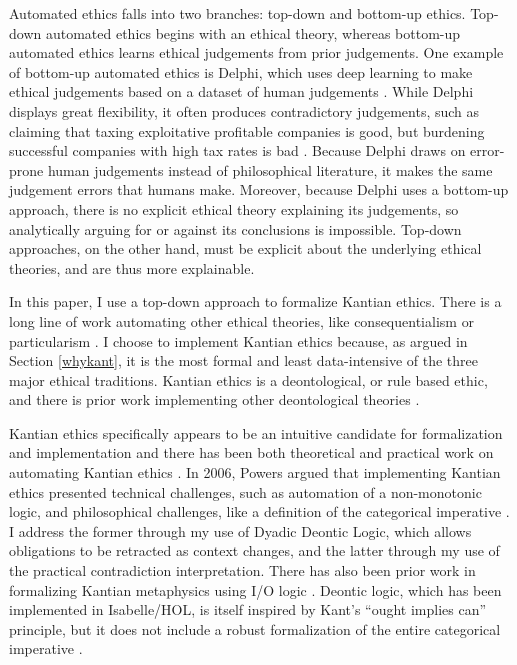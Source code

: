 \begin{isabellebody}
\begin{isamarkuptext}
Automated ethics falls into two branches: top-down and bottom-up ethics. Top-down automated ethics begins 
with an ethical theory, whereas bottom-up automated ethics learns ethical judgements from prior 
judgements. One example of bottom-up automated ethics is Delphi, which uses deep learning to make 
ethical judgements based on a dataset of human judgements \citep{delphi}. While Delphi displays great 
flexibility, it often produces contradictory judgements, such as claiming that taxing exploitative 
profitable companies is good, but burdening successful companies with high tax rates is bad \citep{verge}. 
Because Delphi draws on error-prone human judgements instead of philosophical literature, it makes 
the same judgement errors that humans make. Moreover, because Delphi uses a bottom-up approach, 
there is no explicit ethical theory explaining its judgements, so analytically arguing for or 
against its conclusions is impossible. Top-down approaches, on the other hand, must be explicit about 
the underlying ethical theories, and are thus more explainable. 

In this paper, I use a top-down approach to formalize Kantian ethics. There is a long line of work 
automating other ethical theories, like consequentialism \citep{util2, util1} or particularism 
\citep{particularism1, particularism2}. I choose to implement Kantian ethics because, as argued in 
Section \ref{whykant}, it is the most formal and least data-intensive of the three major ethical 
traditions. Kantian ethics is a deontological, or rule based ethic, and there is prior work 
implementing other deontological theories \citep{deon1, deon2, dde}. 

Kantian ethics specifically appears to be an intuitive candidate for formalization and implementation 
and there has been both theoretical and practical work on automating Kantian ethics \citep{powers, lin}. 
In 2006, Powers argued that implementing Kantian ethics presented technical challenges, 
such as automation of a non-monotonic logic, and philosophical challenges, like a definition of the 
categorical imperative \citep{powers}. I address the former through my use of Dyadic Deontic Logic, which allows 
obligations to be retracted as context changes, and the latter through my use of the practical 
contradiction interpretation. There has also been prior work in formalizing Kantian metaphysics 
using I/O logic \citep{io}. Deontic logic, which has been implemented in Isabelle/HOL, is itself inspired 
by Kant's ``ought implies can'' principle, but it does not include a robust formalization of the entire 
categorical imperative \citep{cresswell}.


\end{isamarkuptext}
\end{isabellebody}
